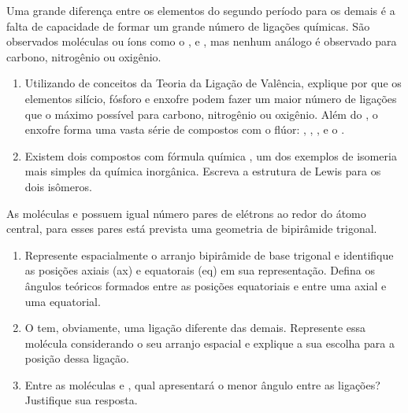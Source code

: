 Uma grande diferença entre os elementos do segundo período para os demais é a falta de capacidade de formar um grande número de ligações químicas.
São observados moléculas ou íons como o ,  e , mas nenhum análogo é observado para carbono, nitrogênio ou oxigênio.

\begin{enumerate}[label = (\alph*)]
	\item Utilizando de conceitos da Teoria da Ligação de Valência, explique por que os elementos silício, fósforo e enxofre podem fazer um maior número de ligações que o máximo possível para carbono, nitrogênio ou oxigênio.
	Além do , o enxofre forma uma vasta série de compostos com o flúor: , , ,  e o .
	\item Existem dois compostos com fórmula química , um dos exemplos de isomeria mais simples da química inorgânica.
	Escreva a estrutura de Lewis para os dois isômeros.
\end{enumerate}

As moléculas  e  possuem igual número pares de elétrons ao redor do átomo central, para esses pares está prevista uma geometria de bipirâmide trigonal.

\begin{enumerate}[resume*]
	\item Represente espacialmente o arranjo bipirâmide de base trigonal e identifique as posições axiais (ax) e equatorais (eq) em sua representação.
		Defina os ângulos teóricos formados entre as posições equatoriais e entre uma axial e uma equatorial.
	\item O  tem, obviamente, uma ligação diferente das demais.
		Represente essa molécula considerando o seu arranjo espacial e explique a sua escolha para a posição dessa ligação.
	\item Entre as moléculas  e , qual apresentará o menor ângulo entre as ligações? Justifique sua resposta.
\end{enumerate}
